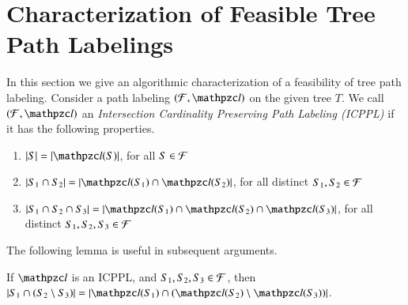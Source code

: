\documentclass[MS,]{iitmdiss}
\begin{document}


\section{Characterization of Feasible Tree Path  Labelings} 
\label{sec:feasible} 
In this section we give an algorithmic characterization of a
feasibility of tree path labeling.
Consider a path labeling $(\cF, \cl)$ on the
given tree $T$. We call $(\cF, \cl)$ an {\em Intersection Cardinality
  Preserving Path Labeling (ICPPL)} if it has the following
properties.

\begin{enumerate}[{\icpplpr\ }i. ]
\item \label{pr:i} $|S| = |\cl(S)|$, \hfill for all $S \in {\cal F}$
\item \label{pr:ii}$|S_1 \cap S_2| = |\cl(S_1) \cap \cl(S_2)|$, \hfill
  for all distinct $S_1, S_2 \in {\cal F}$
\item \label{pr:iii}$|S_1 \cap S_2 \cap S_3| = |\cl(S_1) \cap \cl(S_2)
  \cap \cl(S_3)|$, \hfill for all distinct $S_1, S_2, S_3 \in {\cal F}$
\end{enumerate}


\noindent
The following lemma is useful in subsequent arguments. 
\begin{lemma}
  \label{lem:setminuscard}
  If $\cl$ is an ICPPL, and $S_1, S_2, S_3 \in {\cal F}$, then $|S_1 \cap
  (S_2 \setminus S_3)| = |\cl(S_1) \cap (\cl(S_2) \setminus
  \cl(S_3))|$.
\end{lemma}
\end{document}
